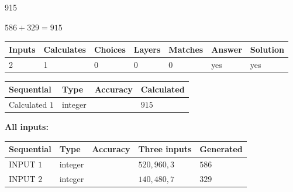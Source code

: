 \documentclass{ctexart}
\begin{document}
\noindent{}
 
 

915
 
 
\noindent{}
 
 

 
 
 
\noindent{}
 
 

$ %
586 +  %
329=   %
915$
 
 
\noindent{}
 
 

 
   
   
   
   
\noindent\begin{tabular}{|l|l|l|l|l|l|l|}
 \hline
Inputs & Calculates & Choices & Layers & Matches & Answer & Solution \\ \hline
 2  & 
 1  & 
 0
  & 
 0  & 
 0  & 
  yes & 
  yes 
  \\ \hline
 \end{tabular}
   
   
   
   
\noindent{}
   
   
  
  
\noindent\begin{tabular}{|l|l|l|l|}
\hline
 Sequential & Type & Accuracy & Calculated \\ 
\hline
 
 
  Calculated $  1 $ & integer &  & 
  $ 915 $ 
 \\  \hline  
 \end{tabular}
   
   
   
   
\noindent\vspace{0.1in}\hspace{-0.08in} {\textbf{\Large{All inputs: }}}
   
   
  
  
\noindent\begin{tabular}{|l|l|l|l|l|}
\hline
 Sequential & Type & Accuracy & Three inputs & Generated \\ 
\hline
 
 
  INPUT $  1 $ & integer &  & $
 520
 , 
 960
 , 
 3
 $ & $ 586 $ 
 \\  \hline  
 
 
  INPUT $  2 $ & integer &  & $
 140
 , 
 480
 , 
 7
 $ & $ 329 $ 
 \\  \hline  
 \end{tabular}
   
\end{document}
